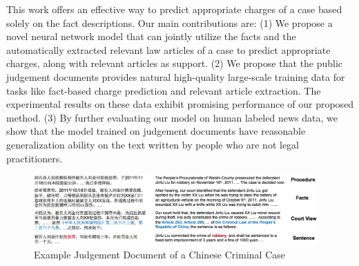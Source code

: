
This work offers an effective way to predict appropriate charges of a case based solely on the fact descriptions. 
Our main contributions are: 
(1) We propose a novel neural network model that can jointly utilize the facts and the automatically extracted relevant law articles of a case to predict appropriate charges, along with relevant articles as support.
(2) We propose that the public judgement documents provides natural high-quality large-scale training data for tasks like fact-based charge prediction and relevant article extraction. The experimental results on these data exhibit promising performance of our proposed method.
(3) By further evaluating our model on human labeled news data, we show that the model trained on judgement documents have reasonable generalization ability on the text written by people who are not legal practitioners. 


\begin{figure}[t!]
\begin{center}
\includegraphics[width=0.97\textwidth]{figures/case.png}	
\caption{Example Judgement Document of a Chinese Criminal Case}
\label{fig_example_case}
\end{center}
\end{figure}
